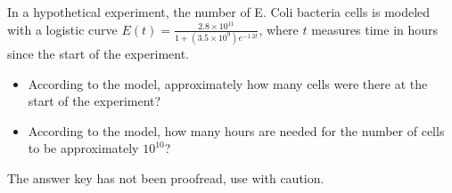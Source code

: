 In a hypothetical experiment, the number of E. Coli bacteria cells is modeled with a logistic curve $\displaystyle E(t)= \frac{2.8\times 10^{11}}{1+ (3.5\times 10^9) e^{-1.2t }} $, where $t$ measures time in hours since the start of the experiment. 
\begin{itemize}
\item According to the model, approximately how many cells were there at the start of the experiment?
\item According to the model, how many hours are needed for the number of cells to be approximately $10^{10}$?
\end{itemize}
The answer key has not been proofread, use with caution.


